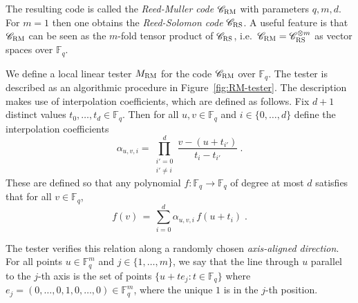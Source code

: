\documentclass[11pt]{article}
\theoremstyle{definition}
\newcommand{\code}{\mathscr{C}}
\newcommand{\F}{\ensuremath{\mathbb{F}}}
\newcommand{\RM}{\ensuremath{\textsc{RM}}}
\newcommand{\RS}{\ensuremath{\textsc{RS}}}
\begin{document}
The resulting code is called the \emph{Reed-Muller code} $\code_\RM$ with parameters $q,m,d$. For $m=1$ then one obtains the \emph{Reed-Solomon code} $\code_\RS$. A useful feature is that $\code_\RM$ can be seen as the $m$-fold tensor product of $\code_\RS$, i.e.\ $\code_\RM = \code_\RS^{\otimes m}$ as vector spaces over $\F_q$. 

We define a local linear tester $M_{\RM}$ for the code $\code_\RM$ over $\F_q$. The tester is described as an algorithmic procedure in Figure~\ref{fig:RM-tester}. %
The description makes use of interpolation coefficients, which are defined as follows. %
Fix $d+1$ distinct values $t_0,\ldots,t_d \in \F_q$. Then for all $u,v \in \F_q$ and $i \in \{0,\ldots,d\}$ define the interpolation coefficients
 \begin{equation}\label{eq:interp-coeff}
 \alpha_{u,v,i} = \prod_{\substack{i'=0\\i'\neq i}}^{d}  \frac{v - (u + t_{i'})}{t_i - t_{i'}}~.
 \end{equation}
These are defined so that any polynomial $f:\F_q\to\F_q$ of degree at most $d$ satisfies
that for all $v \in \F_q$, 
\[ f(v)\,=\, \sum_{i=0}^{d} \alpha_{u,v,i} \, f(u+t_i)\;.\]

The tester verifies this relation along a randomly chosen \emph{axis-aligned direction}.  For all points $u \in \F_q^m$ and $j \in \{1,\ldots,m\}$, we say that the line through $u$ parallel to the $j$-th axis is the set of points $\{ u + te_j : t \in \F_q \}$ where $e_j=(0,\ldots,0,1,0,\ldots,0)\in \F_q^m$, where the unique $1$ is in the $j$-th position. 
\end{document}
